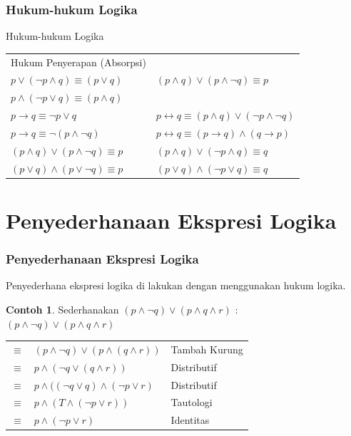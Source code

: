 \documentclass[handout]{beamer}
\theoremstyle{definition}
\theoremstyle{example}
\newtheorem{contoh}[theorem]{Contoh}
\begin{document}
\begin{frame}
	\frametitle{Hukum-hukum Logika}
	\begin{block}{Hukum-hukum Logika}
		\small	
		\begin{tabular}{ | l | l |}
			\hline
			Hukum Penyerapan (Absorpsi)  &   \\ 
			$p \vee (\neg p \wedge q) \equiv (p \vee q)$  & $(p \wedge q)\vee(p \wedge \neg q)\equiv p$  \\  
			$p \wedge (\neg p \vee q) \equiv (p \wedge q)$  &   \\ \hline
				
			$p \rightarrow q \equiv \neg p \vee q$  & $p \leftrightarrow q \equiv (p \wedge q) \vee (\neg p \wedge \neg q)$  \\  
			$p \rightarrow q \equiv \neg (p \wedge \neg q)$  &  $p \leftrightarrow q \equiv (p \rightarrow q) \wedge (q \rightarrow p)$ \\ \hline
				
			$(p \wedge q)\vee (p \wedge \neg q) \equiv p$  & $(p \wedge q)\vee (\neg p \wedge  q) \equiv q$  \\  
			$(p \vee q)\wedge (p \vee \neg q) \equiv p$& $(p \vee q)\wedge (\neg p \vee  q) \equiv q$ \\ \hline		
			
		\end{tabular}
	\end{block}
\end{frame}


\section{Penyederhanaan Ekspresi Logika}
\begin{frame}
	\frametitle{Penyederhanaan Ekspresi Logika}
	Penyederhana ekspresi logika di lakukan dengan menggunakan hukum logika.\\
	\begin{contoh}
		Sederhanakan $(p \wedge \neg q)\vee(p \wedge q \wedge r)$ :\\
		$(p \wedge \neg q)\vee(p \wedge q \wedge r)$\\		
		\begin{tabular}{ l l  l  }						
			$\equiv$ & $(p \wedge \neg q)\vee(p \wedge (q \wedge r))$ & Tambah Kurung   \\ 
			$\equiv$ & $p \wedge (\neg q \vee(q \wedge r))$ & Distributif   \\ 
			$\equiv$ & $p \wedge((\neg q \vee q)\wedge(\neg p \vee r)$ & Distributif \\ 
			$\equiv$ & $p \wedge(T \wedge (\neg p \vee r))$ & Tautologi  \\ 
			$\equiv$ & $p \wedge(\neg p \vee r)$ & Identitas   			
		\end{tabular}
	\end{contoh}	
\end{frame}
\end{document}
